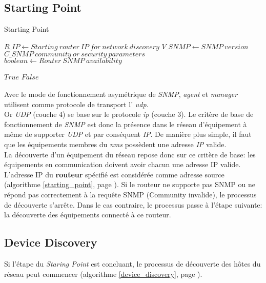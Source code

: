 \subsection{Starting Point}
{\selectfont
\begin{center}
\begin{algorithm}
\caption{Starting Point}
\label{starting_point}

\begin{algorithmic}[1]
\Require $R\_IP \gets Starting ~ router~ IP~for ~ network~ discovery$
\Require $V\_SNMP \gets SNMP~ version$
\Require $C\_SNMP ~ community~ or~ security~ parameters~$
\Ensure $boolean \gets Router ~ SNMP~ availability~$

    \State \Return $True$
   \Else
    \State \Return $False$
   \EndIf
    
\EndFunction

\end{algorithmic}

\end{algorithm}
\end{center}
}
Avec le mode de fonctionnement asymétrique de \emph{SNMP},   \emph{\gls*{agent}} et  \emph{\gls*{manager}} utilisent comme protocole de transport l' \emph{\gls*{udp}}.\\
Or \emph{UDP} (couche 4) se base sur le protocole  \emph{\gls*{ip}} (couche 3). Le critère de base de  fonctionnement de \emph{SNMP} est donc la présence dans le réseau d'équipement à même de supporter \emph{UDP} et par conséquent \emph{IP}. De manière plus simple, il faut que les équipements  membres du  \emph{\gls*{nms}} possèdent une adresse \emph{IP} valide.\\
La découverte d'un équipement du réseau repose donc sur ce critère de base: les équipements en communication doivent avoir chacun une adresse IP valide. L'adresse IP du \textbf{routeur} spécifié est considérée comme adresse source (algorithme \ref{starting_point}, page \pageref{starting_point}). Si le routeur ne supporte pas SNMP ou ne répond pas correctement à la requête SNMP (Community invalide), le processus de découverte s'arrête. Dans le cas contraire, le processus passe à l'étape suivante: la découverte des équipements connecté à ce routeur.\\


\subsection{Device Discovery}
Si l'étape du \emph{Staring Point} est concluant, le processus de découverte des hôtes du réseau peut commencer (algorithme \ref{device_discovery}, page \pageref{device_discovery}).


